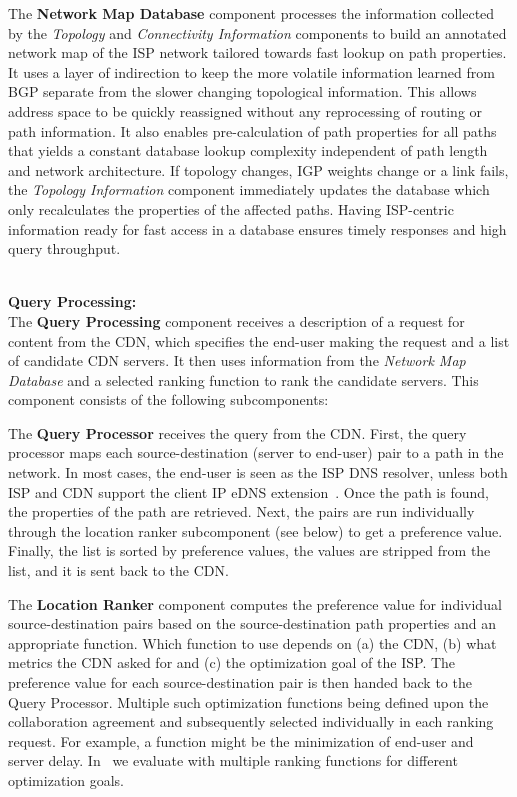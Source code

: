 The {\bf Network Map Database} component processes the information collected by
the {\it Topology} and {\it Connectivity Information} components to build an
annotated network map of the ISP network tailored towards fast lookup on path
properties.  It uses a layer of indirection to keep the more volatile
information learned from BGP separate from the slower changing topological
information.  This allows address space to be quickly reassigned without any
reprocessing of routing or path information.  It also enables pre-calculation
of path properties for all paths that yields a constant database lookup
complexity independent of path length and network architecture.  If topology
changes, \eg IGP weights change or a link fails, the {\it Topology Information}
component immediately updates the database which only recalculates the
properties of the affected paths.  Having ISP-centric information ready for
fast access in a database ensures timely responses and high query throughput.



\ \\\noindent\textbf{Query Processing:}\label{sec:Query-Processing}\\\noindent
The {\bf Query Processing} component receives a description of a request for
content from the CDN, which specifies the end-user making the request and a
list of candidate CDN servers.  It then uses information from the {\it Network
  Map Database} and a selected ranking function to rank the candidate servers.
This component consists of the following subcomponents:

The {\bf Query Processor} receives the query from the CDN.  First, the query
processor maps each source-destination (server to end-user) pair to a path in
the network.  In most cases, the end-user is seen as the ISP DNS resolver,
unless both ISP and CDN support the client IP eDNS
extension~\cite{DNS-extension-IP-client}.  Once the path is found, the
properties of the path are retrieved. Next, the pairs are run individually
through the location ranker subcomponent (see below) to get a preference value.
Finally, the list is sorted by preference values, the values are stripped from
the list, and it is sent back to the CDN.

The {\bf Location Ranker} component computes the preference value for
individual source-destination pairs based on the source-destina\-tion path
properties and an appropriate function.  Which function to use depends on (a)
the CDN, (b) what metrics the CDN asked for and (c) the optimization goal of
the ISP.  The preference value for each source-destination pair is then handed
back to the Query Processor.  Multiple such optimization functions being
defined upon the collaboration agreement and subsequently selected individually
in each ranking request. For example, a function might be the minimization of
end-user and server delay.  In~\cite{CaTE-TR} we evaluate \cate
with multiple ranking functions for different optimization goals.


